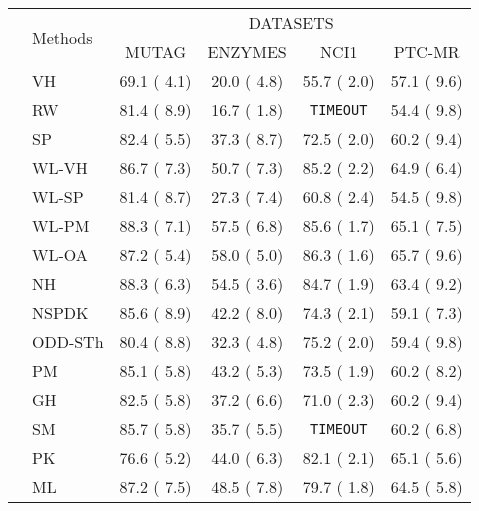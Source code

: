\documentclass[twoside,11pt]{article}
\begin{document}
\begin{table}[!t]
\centering
\scriptsize
\def\arraystretch{1.05}
\begin{tabular}{llcccc} \toprule
& \multirow{3}{*}{Methods} & \multicolumn{4}{c}{DATASETS} \\ \cline{3-6}
& & \multirow{2}{*}{MUTAG} & \multirow{2}{*}{ENZYMES} & \multirow{2}{*}{NCI1} & \multirow{2}{*}{PTC-MR} \\
& & & & & \\ 
\midrule
\parbox[t]{2mm}{} & VH & 69.1 {\tiny ( 4.1)} & 20.0 {\tiny ( 4.8)} & 55.7 {\tiny ( 2.0)} & 57.1 {\tiny ( 9.6)} \\ 
& RW & 81.4 {\tiny ( 8.9)} & 16.7 {\tiny ( 1.8)} & \texttt{TIMEOUT} & 54.4 {\tiny ( 9.8)} \\ 
& SP & 82.4 {\tiny ( 5.5)} & 37.3 {\tiny ( 8.7)} & 72.5 {\tiny ( 2.0)} & 60.2 {\tiny ( 9.4)} \\ 
& WL-VH & 86.7 {\tiny ( 7.3)} & 50.7 {\tiny ( 7.3)} & 85.2 {\tiny ( 2.2)} & 64.9 {\tiny ( 6.4)} \\ 
& WL-SP & 81.4 {\tiny ( 8.7)} & 27.3 {\tiny ( 7.4)} & 60.8 {\tiny ( 2.4)} & 54.5 {\tiny ( 9.8)} \\ 
& WL-PM & 88.3 {\tiny ( 7.1)} & 57.5 {\tiny ( 6.8)} & 85.6 {\tiny ( 1.7)} & 65.1 {\tiny ( 7.5)} \\ 
& WL-OA & 87.2 {\tiny ( 5.4)} & 58.0 {\tiny ( 5.0)} & 86.3 {\tiny ( 1.6)} & 65.7 {\tiny ( 9.6)} \\ 
& NH & 88.3 {\tiny ( 6.3)} & 54.5 {\tiny ( 3.6)} & 84.7 {\tiny ( 1.9)} & 63.4 {\tiny ( 9.2)} \\ 
& NSPDK & 85.6 {\tiny ( 8.9)} & 42.2 {\tiny ( 8.0)} & 74.3 {\tiny ( 2.1)} & 59.1 {\tiny ( 7.3)} \\ 
& ODD-STh & 80.4 {\tiny ( 8.8)} & 32.3 {\tiny ( 4.8)} & 75.2 {\tiny ( 2.0)} & 59.4 {\tiny ( 9.8)} \\ 
& PM & 85.1 {\tiny ( 5.8)} & 43.2 {\tiny ( 5.3)} & 73.5 {\tiny ( 1.9)} & 60.2 {\tiny ( 8.2)} \\ 
& GH & 82.5 {\tiny ( 5.8)} & 37.2 {\tiny ( 6.6)} & 71.0 {\tiny ( 2.3)} & 60.2 {\tiny ( 9.4)} \\ 
& SM & 85.7 {\tiny ( 5.8)} & 35.7 {\tiny ( 5.5)} & \texttt{TIMEOUT} & 60.2 {\tiny ( 6.8)} \\ 
& PK & 76.6 {\tiny ( 5.2)} & 44.0 {\tiny ( 6.3)} & 82.1 {\tiny ( 2.1)} & 65.1 {\tiny ( 5.6)} \\ 
& ML & 87.2 {\tiny ( 7.5)} & 48.5 {\tiny ( 7.8)} & 79.7 {\tiny ( 1.8)} & 64.5 {\tiny ( 5.8)} \\ 

\end{tabular}
\end{table}
\end{document}
